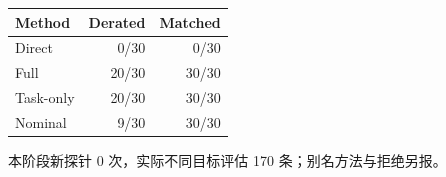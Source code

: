 \begin{center}\small
\begin{tabular}{lrr}
\toprule
Method & Derated & Matched\\
\midrule
Direct & 0/30 & 0/30\\
Full & 20/30 & 30/30\\
Task-only & 20/30 & 30/30\\
Nominal & 9/30 & 30/30\\
\bottomrule
\end{tabular}
\end{center}
本阶段新探针 0 次，实际不同目标评估 170 条；别名方法与拒绝另报。
